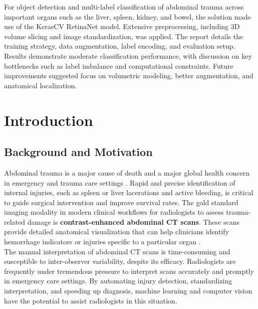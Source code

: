 \documentclass[a4paper,12pt]{article}
\begin{document}
For object detection and multi-label classification of abdominal trauma across important organs such as the liver, spleen, kidney, and bowel, the solution made use of the KerasCV RetinaNet model. Extensive preprocessing, including 3D volume slicing and image standardization, was applied. The report details the training strategy, data augmentation, label encoding, and evaluation setup. Results demonstrate moderate classification performance, with discussion on key bottlenecks such as label imbalance and computational constraints. Future improvements suggested focus on volumetric modeling, better augmentation, and anatomical localization.
\clearpage
\tableofcontents
\clearpage

\listoftables
\listoffigures
\cleardoublepage

\clearpage
\pagestyle{fancy}
\fancyhf{}  %
\renewcommand{\headrulewidth}{0.5pt}  %

\section{Introduction}
\subsection{Background and Motivation}
Abdominal trauma is a major cause of death and a major global health concern in emergency and trauma care settings \cite{deunk2007value}. Rapid and precise identification of internal injuries, such as spleen or liver lacerations and active bleeding, is critical to guide surgical intervention and improve survival rates. The gold standard imaging modality in modern clinical workflows for radiologists to assess trauma-related damage is \textbf{contrast-enhanced abdominal CT scans}. These scans provide detailed anatomical visualization that can help clinicians identify hemorrhage indicators or injuries specific to a particular organ \cite{soto2005ct}.\\


The manual interpretation of abdominal CT scans is time-consuming and susceptible to inter-observer variability, despite its efficacy. Radiologists are frequently under tremendous pressure to interpret scans accurately and promptly in emergency care settings. By automating injury detection, standardizing interpretation, and speeding up diagnosis, machine learning and computer vision have the potential to assist radiologists in this situation.\\
\end{document}

